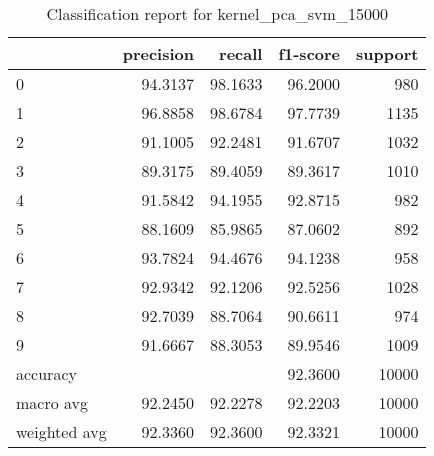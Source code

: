 \begin{table}[htb!]
\centering
\begin{tabular}{lrrrr}
    \toprule
 & precision & recall & f1-score & support \\
\midrule
0 & 94.3137 & 98.1633 & 96.2000 & 980 \\
1 & 96.8858 & 98.6784 & 97.7739 & 1135 \\
2 & 91.1005 & 92.2481 & 91.6707 & 1032 \\
3 & 89.3175 & 89.4059 & 89.3617 & 1010 \\
4 & 91.5842 & 94.1955 & 92.8715 & 982 \\
5 & 88.1609 & 85.9865 & 87.0602 & 892 \\
6 & 93.7824 & 94.4676 & 94.1238 & 958 \\
7 & 92.9342 & 92.1206 & 92.5256 & 1028 \\
8 & 92.7039 & 88.7064 & 90.6611 & 974 \\
9 & 91.6667 & 88.3053 & 89.9546 & 1009 \\
accuracy & & & 92.3600 & 10000\\
macro avg & 92.2450 & 92.2278 & 92.2203 & 10000 \\
weighted avg & 92.3360 & 92.3600 & 92.3321 & 10000 \\
\bottomrule
\end{tabular}
\caption{Classification report for kernel\_pca\_svm\_15000}
\label{tab:classification-report-kernel_pca_svm_15000}
\end{table}
